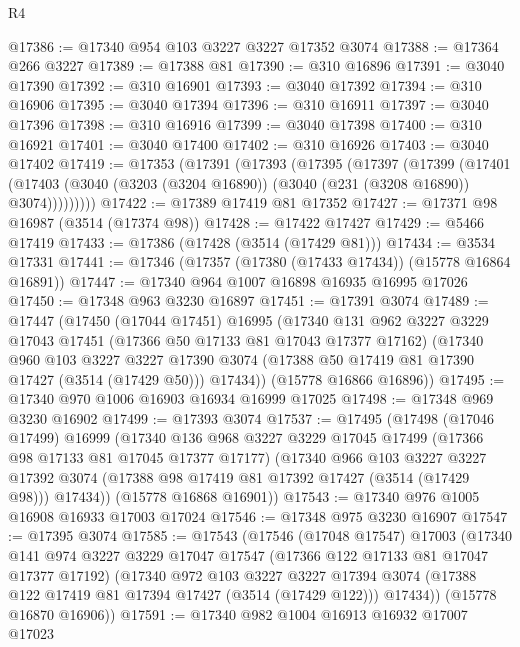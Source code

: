 \begin{lexlean}{R4}
\begin{coremodule}
@17386 := @17340 @954 @103 @3227 @3227 @17352 @3074
@17388 := @17364 @266 @3227
@17389 := @17388 @81
@17390 := @310 @16896
@17391 := @3040 @17390
@17392 := @310 @16901
@17393 := @3040 @17392
@17394 := @310 @16906
@17395 := @3040 @17394
@17396 := @310 @16911
@17397 := @3040 @17396
@17398 := @310 @16916
@17399 := @3040 @17398
@17400 := @310 @16921
@17401 := @3040 @17400
@17402 := @310 @16926
@17403 := @3040 @17402
@17419 := @17353
    (@17391
      (@17393
        (@17395
          (@17397
            (@17399
              (@17401
                (@17403 (@3040 (@3203 (@3204 @16890)) (@3040 (@231 (@3208 @16890)) @3074)))))))))
@17422 := @17389 @17419 @81 @17352
@17427 := @17371 @98 @16987 (@3514 (@17374 @98))
@17428 := @17422 @17427
@17429 := @5466 @17419
@17433 := @17386 (@17428 (@3514 (@17429 @81)))
@17434 := @3534 @17331
@17441 := @17346 (@17357 (@17380 (@17433 @17434)) (@15778 @16864 @16891))
@17447 := @17340 @964 @1007 @16898 @16935 @16995 @17026
@17450 := @17348 @963 @3230 @16897
@17451 := @17391 @3074
@17489 := @17447
    (@17450
      (@17044 @17451)
      @16995
      (@17340
        @131
        @962
        @3227
        @3229
        @17043
        @17451
        (@17366 @50 @17133 @81 @17043 @17377 @17162)
        (@17340
          @960
          @103
          @3227
          @3227
          @17390
          @3074
          (@17388 @50 @17419 @81 @17390 @17427 (@3514 (@17429 @50)))
          @17434))
      (@15778 @16866 @16896))
@17495 := @17340 @970 @1006 @16903 @16934 @16999 @17025
@17498 := @17348 @969 @3230 @16902
@17499 := @17393 @3074
@17537 := @17495
    (@17498
      (@17046 @17499)
      @16999
      (@17340
        @136
        @968
        @3227
        @3229
        @17045
        @17499
        (@17366 @98 @17133 @81 @17045 @17377 @17177)
        (@17340
          @966
          @103
          @3227
          @3227
          @17392
          @3074
          (@17388 @98 @17419 @81 @17392 @17427 (@3514 (@17429 @98)))
          @17434))
      (@15778 @16868 @16901))
@17543 := @17340 @976 @1005 @16908 @16933 @17003 @17024
@17546 := @17348 @975 @3230 @16907
@17547 := @17395 @3074
@17585 := @17543
    (@17546
      (@17048 @17547)
      @17003
      (@17340
        @141
        @974
        @3227
        @3229
        @17047
        @17547
        (@17366 @122 @17133 @81 @17047 @17377 @17192)
        (@17340
          @972
          @103
          @3227
          @3227
          @17394
          @3074
          (@17388 @122 @17419 @81 @17394 @17427 (@3514 (@17429 @122)))
          @17434))
      (@15778 @16870 @16906))
@17591 := @17340 @982 @1004 @16913 @16932 @17007 @17023

\end{coremodule}
\end{lexlean}

